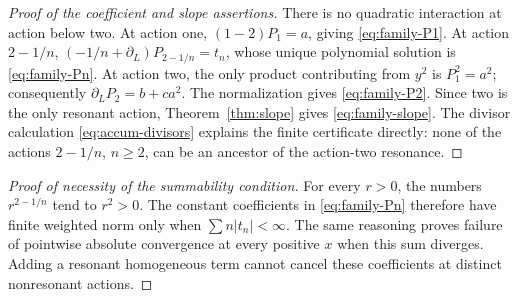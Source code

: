 \documentclass[11pt,a4paper]{article}
\numberwithin{equation}{section}
\theoremstyle{definition}
\theoremstyle{remark}
\newcommand{\dd}{\partial_L}
\begin{document}
\begin{proof}[Proof of the coefficient and slope assertions]
There is no quadratic interaction at action below two. At action one,
\((1-2)P_1=a\), giving \eqref{eq:family-P1}. At action \(2-1/n\),
\((-1/n+\dd)P_{2-1/n}=t_n\), whose unique polynomial solution is
\eqref{eq:family-Pn}. At action two, the only product contributing
from \(y^2\) is \(P_1^2=a^2\); consequently
\(\dd P_2=b+ca^2\). The normalization gives
\eqref{eq:family-P2}. Since two is the only resonant action,
Theorem~\ref{thm:slope} gives \eqref{eq:family-slope}.
The divisor calculation \eqref{eq:accum-divisors} explains the finite
certificate directly: none of the actions \(2-1/n\), \(n\ge2\),
can be an ancestor of the action-two resonance.
\end{proof}

\begin{proof}[Proof of necessity of the summability condition]
For every \(r>0\), the numbers \(r^{2-1/n}\) tend to \(r^2>0\).
The constant coefficients in \eqref{eq:family-Pn} therefore have
finite weighted norm only when \(\sum n|t_n|<\infty\).
The same reasoning proves failure of pointwise absolute convergence
at every positive \(x\) when this sum diverges. Adding a resonant
homogeneous term cannot cancel these coefficients at distinct
nonresonant actions.
\end{proof}
\end{document}
